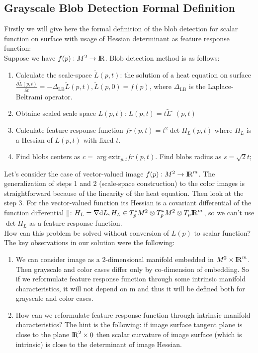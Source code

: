 \documentclass{llncs}
\newcommand{\LaplaceBeltrami}{\Delta_{\mathrm{LB}}}
\newcommand{\partderiv}[2]{\frac{\partial #1}{\partial #2}}
\newcommand{\extr}[1]{\mathrm{extr}_{#1}}
\newcommand{\toreal}{\rightarrow\bbbr}
\newcommand{\toeuclidean}[1]{\rightarrow\bbbr^{#1}}
\newcommand{\CovariantDiff}{\nabla}
\newcommand{\Diff}{\mathrm{d}}
\newcommand{\TangentSpaceP}[1]{{T_p}{#1}}
\newcommand{\CotangentSpaceP}[1]{\tensor*{T}{^{*}_{p}}{#1}}
\begin{document}
\subsection{Grayscale Blob Detection Formal Definition}
Firstly we will give here the formal definition of the blob detection for scalar function on surface with usage of Hessian determinant as feature response function: \\
Suppose we have  $f(p):M^2 \toreal$. Blob detection method is as follows:
\begin{enumerate} 
\item Calculate the scale-space $\tilde{L}(p,t)$: the solution of a heat equation  on surface
  $\partderiv{\tilde{L}(p, t)}{t}=-\LaplaceBeltrami{ \tilde{L}(p, t)},\tilde{L}(p, 0)=f(p)$, where $\LaplaceBeltrami$ is the Laplace-Beltrami operator.
\item Obtaine scaled scale space $L(p, t)$: $L(p, t)=t\tilde{L} ̃(p, t)$
\item Calculate feature response function $fr(p, t)=t^2 \det{H_L(p,t)}$ where $H_L$ is a Hessian of $L(p, t)$  with fixed $t$.
\item Find blobs centers as $c=\arg \extr{p,t} fr(p, t)$. Find blobs radius as $s=\sqrt{2} t$;
\end{enumerate}

Let’s consider the case of vector-valued image $f(p):M^2 \toeuclidean{m}$. The generalization of steps 1 and 2 (scale-space construction) to the color images is straightforward because of the linearity of the heat equation. Then look at the step 3. For the vector-valued function its Hessian is a covariant differential of the function differential []: $H_L=\CovariantDiff \Diff L ,H_L \in \CotangentSpaceP{M^2}\otimes\CotangentSpaceP{M^2}\otimes\TangentSpaceP{\bbbr^m}$, so we can’t use  $\det H_L$ as a feature response function. 
\\
How can this problem be solved without conversion of $L(p)$ to scalar function? The key observations in our solution were the following:
\begin{enumerate}
\item	We can consider image as a 2-dimensional manifold embedded in $M^2\times{\rm I\!R}^m$. Then grayscale and color cases differ only by co-dimension of embedding. So if we reformulate feature response function through some intrinsic manifold characteristics, it will not depend on m and thus it will be defined both for grayscale and color cases. 
\item	How can we reformulate feature response function through intrinsic manifold characteristics? The hint is the following: if image surface tangent plane is close to the plane ${\rm I\!R}^2\times 0$ then scalar curvature of image surface (which is intrinsic) is close to the determinant of image Hessian. 
\end{enumerate}
\end{document}
